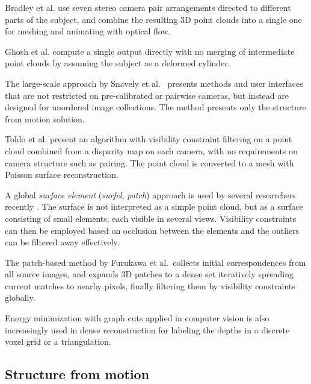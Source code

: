 Bradley et al. use seven stereo camera pair arrangements directed to different parts of the subject, and combine the resulting 3D point clouds into a single one for meshing and animating with optical flow. \cite{bradley2008markerless,bradley2010high}

Ghosh et al. \cite{ghosh2011multiview} compute a single output directly with no merging of intermediate point clouds by assuming the subject as a deformed cylinder.

The large-scale approach by Snavely et al.~\cite{snavely2006photo} presents methods and user interfaces that are not restricted on pre-calibrated or pairwise cameras, but instead are designed for unordered image collections.
The method presents only the structure from motion solution.

Toldo et al. present an algorithm with visibility constraint filtering on a point cloud combined from a disparity map on each camera, with no requirements on camera structure such as pairing.
The point cloud is converted to a mesh with Poisson surface reconstruction.
\cite{toldo2013accurate,toldo2013towards}

A global \emph{surface element} (\emph{surfel}, \emph{patch}) approach is used by several researchers recently \cite{carceroni2002multi,furukawa2010accurate,vu2012high,chang2011gpu}.
The surface is not interpreted as a simple point cloud, but as a surface consisting of small elements, each visible in several views.
Visibility constraints can then be employed based on occlusion between the elements and the outliers can be filtered away effectively.

The patch-based method by Furukawa et al.\ collects initial correspondences from all source images, and expands 3D patches to a dense set iteratively spreading current matches to nearby pixels, finally filtering them by visibility constraints globally. \cite{furukawa2012patch,furukawa2010accurate}

Energy minimization with graph cuts applied in computer vision \cite{boykov2004experimental} is also increasingly used in dense reconstruction \cite{chang2011gpu,vu2012high,labatut2009robust,jancosek2011multi} for labeling the depths in a discrete voxel grid or a triangulation.


\subsection{Structure from motion} \label{sec:sfm} %


